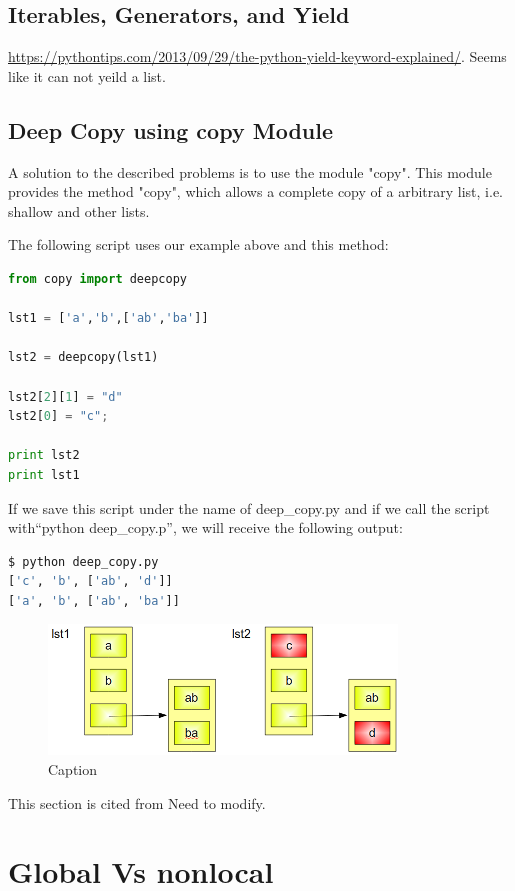 \documentclass[../main.tex]{subfiles}
\begin{document}
\subsection{Iterables, Generators, and Yield}
\url{https://pythontips.com/2013/09/29/the-python-yield-keyword-explained/}. Seems like it can not yeild a list. 
\subsection{Deep Copy using copy Module}
A solution to the described problems is to use the module "copy". This module provides the method "copy", which allows a complete copy of a arbitrary list, i.e. shallow and other lists.

The following script uses our example above and this method:
\begin{lstlisting}[language = Python]
from copy import deepcopy

lst1 = ['a','b',['ab','ba']]

lst2 = deepcopy(lst1)

lst2[2][1] = "d"
lst2[0] = "c";

print lst2
print lst1
\end{lstlisting}
If we save this script under the name of deep\_copy.py and if we call the script with``python deep\_copy.p'', we will receive the following output:
\begin{lstlisting}[language = Python]
$ python deep_copy.py 
['c', 'b', ['ab', 'd']]
['a', 'b', ['ab', 'ba']]
\end{lstlisting}
\begin{figure}[h]
    \centering
    \includegraphics{fig/deep_copy_5.png}
    \caption{Caption}
    \label{fig:copy_4}
\end{figure}

This section is cited from %
Need to modify. 
\section{Global Vs nonlocal}
\end{document}
